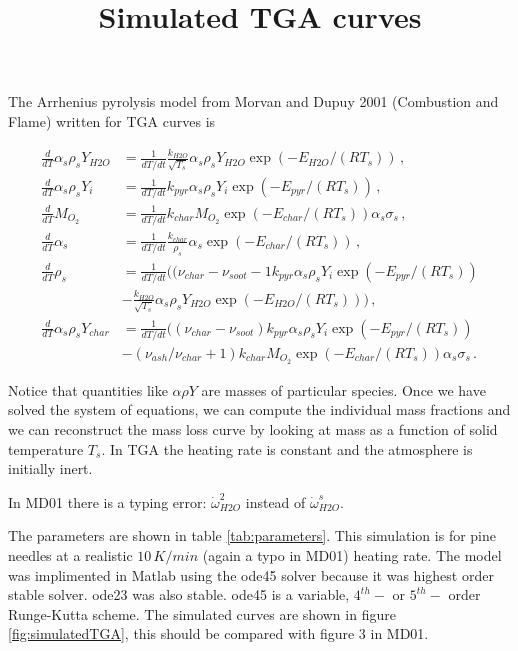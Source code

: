 \documentclass[reqno]{amsart}
\title{Simulated TGA curves}
\begin{document}
\maketitle

The Arrhenius pyrolysis model from Morvan and Dupuy 2001 (Combustion and Flame) written for TGA curves is

\begin{align}
\frac{d}{dT} \alpha_s \rho_s Y_{H2O} &=\frac{1}{dT/dt}\frac{k_{H2O}}{\sqrt{T_s}} \alpha_s\rho_s Y_{H2O} \exp(-E_{H2O}/(RT_s)) \,,\\
\frac{d}{dT} \alpha_s \rho_s Y_{i} &=\frac{1}{dT/dt}k_{pyr}\alpha_s\rho_s Y_i \exp(-E_{pyr}/(RT_s)) \,,\\
\frac{d}{dT} M_{O_2} &=\frac{1}{dT/dt}k_{char} M_{O_2} \exp(-E_{char}/(RT_s))\alpha_s \sigma_s \,,\\
\frac{d}{dT} \alpha_s &=\frac{1}{dT/dt}\frac{k_{char}}{\rho_s}\alpha_s \exp(-E_{char}/(RT_s)) \,,\\
\frac{d}{dT} \rho_s &=\frac{1}{dT/dt}\big((\nu_{char}-\nu_{soot}-1  k_{pyr} \alpha_s \rho_s Y_i \exp(-E_{pyr}/(RT_s)) \nonumber \\
                    & -\frac{k_{H2O}}{\sqrt{T_s}} \alpha_s\rho_s Y_{H2O} \exp(-E_{H2O}/(RT_s))\big) \,,\\
\frac{d}{dT} \alpha_s \rho_s Y_{char} &=\frac{1}{dT/dt}\big( (\nu_{char}-\nu_{soot}) k_{pyr}\alpha_s\rho_s Y_i \exp(-E_{pyr}/(RT_s)) \nonumber \\
&-(\nu_{ash}/\nu_{char}+1) k_{char} M_{O_2} \exp(-E_{char}/(RT_s))\alpha_s \sigma_s \,.
\label{eqn:TGAmodel}
\end{align}

Notice that quantities like $\alpha\rho Y$ are masses of particular species. 
Once we have solved the system of equations, we can compute the individual mass fractions and we can reconstruct the mass loss curve by looking at mass as a function of solid temperature $T_s$. 
In TGA the heating rate is constant and the atmosphere is initially inert.

In MD01 there is a typing error: $\dot{\omega}^2_{H2O}$ instead of $\dot{\omega}^s_{H2O}$.

The parameters are shown in table \ref{tab:parameters}.
This simulation is for pine needles at a realistic $10\,K/min$ (again a typo in MD01) heating rate. 
The model was implimented in Matlab using the ode45 solver because it was highest order stable solver. 
ode23 was also stable. 
ode45 is a variable, $4^{th}-$ or $5^{th}-$ order Runge-Kutta scheme.
The simulated curves are shown in figure \ref{fig:simulatedTGA}, this should be compared with figure $3$ in MD01.
\end{document}
